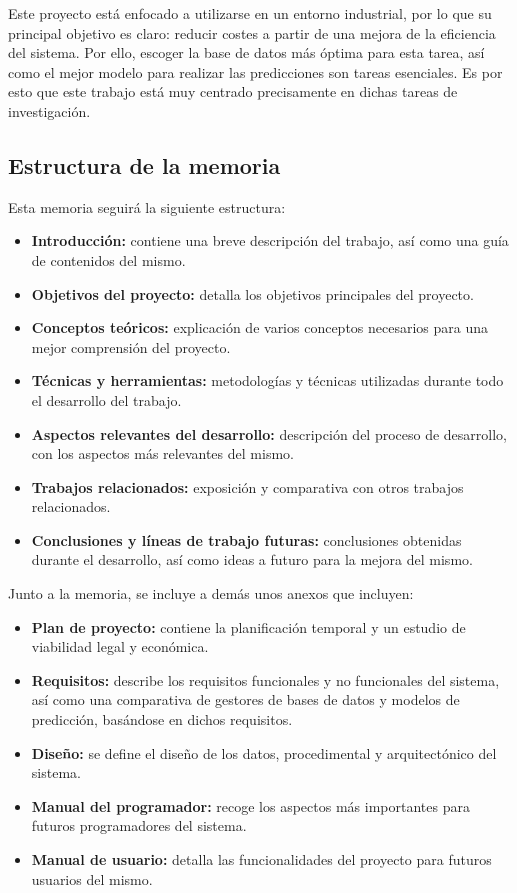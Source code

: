 Este proyecto está enfocado a utilizarse en un entorno industrial, por lo que su principal objetivo es claro:
reducir costes a partir de una mejora de la eficiencia del sistema. Por ello, escoger la base de datos más 
óptima para esta tarea, así como el mejor modelo para realizar las predicciones son tareas esenciales. Es por 
esto que este trabajo está muy centrado precisamente en dichas tareas de investigación.

\subsection{Estructura de la memoria}

Esta memoria seguirá la siguiente estructura:
\begin{itemize}
    \item \textbf{Introducción:} contiene una breve descripción del trabajo, así como una guía de contenidos del mismo.
    \item \textbf{Objetivos del proyecto:} detalla los objetivos principales del proyecto.
    \item \textbf{Conceptos teóricos:} explicación de varios conceptos necesarios para una mejor comprensión del
        proyecto.
    \item \textbf{Técnicas y herramientas:} metodologías y técnicas utilizadas durante todo el desarrollo del 
        trabajo.
    \item \textbf{Aspectos relevantes del desarrollo:} descripción del proceso de desarrollo, con los aspectos
        más relevantes del mismo.
    \item \textbf{Trabajos relacionados:} exposición y comparativa con otros trabajos relacionados.
    \item \textbf{Conclusiones y líneas de trabajo futuras:} conclusiones obtenidas durante el desarrollo, así
        como ideas a futuro para la mejora del mismo.
\end{itemize}

Junto a la memoria, se incluye a demás unos anexos que incluyen:
\begin{itemize}
    \item \textbf{Plan de proyecto:} contiene la planificación temporal y un estudio de viabilidad legal y
        económica.
    \item \textbf{Requisitos:} describe los requisitos funcionales y no funcionales del sistema, así como una
        comparativa de gestores de bases de datos y modelos de predicción, basándose en dichos requisitos.
    \item \textbf{Diseño:} se define el diseño de los datos, procedimental y arquitectónico del sistema.
    \item \textbf{Manual del programador:} recoge los aspectos más importantes para futuros programadores del sistema.
    \item \textbf{Manual de usuario:} detalla las funcionalidades del proyecto para futuros usuarios del
        mismo.
\end{itemize}

